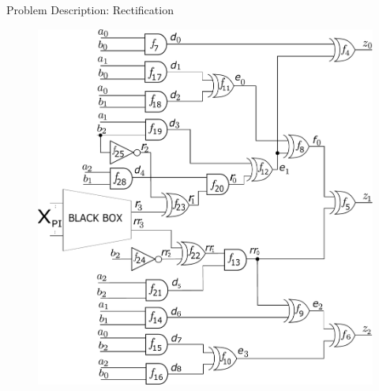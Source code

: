 \begin{frame}{\large Problem Description: Rectification}

\begin{figure}[hbt]
\centering
\includegraphics[scale=0.26]{mas_3_ddc_mfr_b_bb.pdf}
\caption*{
}\label{fig:mas_bug_Wb_bb}
\end{figure}
\end{frame}



